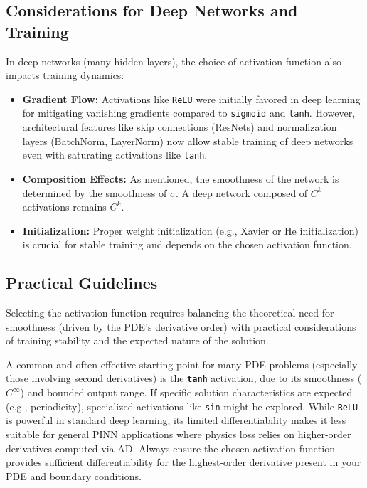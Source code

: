\subsection{Considerations for Deep Networks and Training}

In deep networks (many hidden layers), the choice of activation function also impacts training dynamics:
\begin{itemize}
    \item \textbf{Gradient Flow:} Activations like \texttt{ReLU} were initially favored in deep learning for mitigating vanishing gradients compared to \texttt{sigmoid} and \texttt{tanh}. However, architectural features like skip connections (ResNets) and normalization layers (BatchNorm, LayerNorm) now allow stable training of deep networks even with saturating activations like \texttt{tanh}.
    \item \textbf{Composition Effects:} As mentioned, the smoothness of the network is determined by the smoothness of $\sigma$. A deep network composed of $C^k$ activations remains $C^k$.
    \item \textbf{Initialization:} Proper weight initialization (e.g., Xavier or He initialization) is crucial for stable training and depends on the chosen activation function.
\end{itemize}

\subsection{Practical Guidelines}

Selecting the activation function requires balancing the theoretical need for smoothness (driven by the PDE's derivative order) with practical considerations of training stability and the expected nature of the solution.

A common and often effective starting point for many PDE problems (especially those involving second derivatives) is the \textbf{\texttt{tanh}} activation, due to its smoothness ($C^\infty$) and bounded output range. If specific solution characteristics are expected (e.g., periodicity), specialized activations like \texttt{sin} might be explored. While \texttt{ReLU} is powerful in standard deep learning, its limited differentiability makes it less suitable for general PINN applications where physics loss relies on higher-order derivatives computed via AD. Always ensure the chosen activation function provides sufficient differentiability for the highest-order derivative present in your PDE and boundary conditions.

